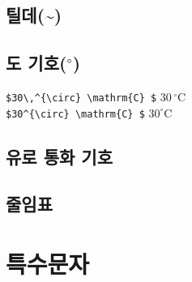 						
		\subsection{틸데(\~{})}
	
		\subsection{도 기호($^{\circ}$)}
	
			\begin{framed}
			\verb|$30\,^{\circ} \mathrm{C} $|  	$30\,^{\circ} \mathrm{C} $ \\
			\verb|$30^{\circ} \mathrm{C} $|  		$30^{\circ} \mathrm{C} $
			\end{framed}
	
		\subsection{유로 통화 기호}
		
	
		\subsection{줄임표}




	\section{특수문자}


